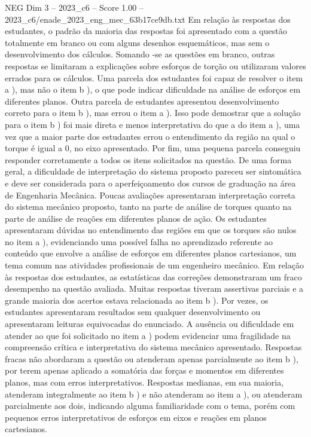 \begin{textsample}{NEG Dim 3 – 2023\_c6 – Score 1.00 – 2023\_c6/enade\_2023\_eng\_mec\_63b17ce9db.txt}
Em relação às respostas dos estudantes, o padrão da maioria das respostas foi apresentado com a questão totalmente em branco ou com alguns desenhos esquemáticos, mas sem o desenvolvimento dos cálculos.
Somando -se as questões em branco, outras respostas se limitaram a explicações sobre esforços de torção ou utilizaram valores errados para os cálculos.
Uma parcela dos estudantes foi capaz de resolver o item a ), mas não o item b ), o que pode indicar dificuldade na análise de esforços em diferentes planos.
Outra parcela de estudantes apresentou desenvolvimento correto para o item b ), mas errou o item a ).
Isso pode demostrar que a solução para o item b ) foi mais direta e menos interpretativa do que a do item a ), uma vez que a maior parte dos estudantes errou o entendimento da região na qual o torque é igual a 0, no eixo apresentado.
Por fim, uma pequena parcela conseguiu responder corretamente a todos os itens solicitados na questão.
De uma forma geral, a dificuldade de interpretação do sistema proposto pareceu ser sintomática e deve ser considerada para o aperfeiçoamento dos cursos de graduação na área de Engenharia Mecânica.
Poucas avaliações apresentaram interpretação correta do sistema mecânico proposto, tanto na parte de análise de torques quanto na parte de análise de reações em diferentes planos de ação.
Os estudantes apresentaram dúvidas no entendimento das regiões em que os torques são nulos no item a ), evidenciando uma possível falha no aprendizado referente ao conteúdo que envolve a análise de esforços em diferentes planos cartesianos, um tema comum nas atividades profissionais de um engenheiro mecânico.
Em relação às respostas dos estudantes, as estatísticas das correções demonstraram um fraco desempenho na questão avaliada.
Muitas respostas tiveram assertivas parciais e a grande maioria dos acertos estava relacionada ao item b ).
Por vezes, os estudantes apresentaram resultados sem qualquer desenvolvimento ou apresentaram leituras equivocadas do enunciado.
A ausência ou dificuldade em atender ao que foi solicitado no item a ) podem evidenciar uma fragilidade na compreensão crítica e interpretativa do sistema mecânico apresentado.
Respostas fracas não abordaram a questão ou atenderam apenas parcialmente ao item b ), por terem apenas aplicado a somatória das forças e momentos em diferentes planos, mas com erros interpretativos.
Respostas medianas, em sua maioria, atenderam integralmente ao item b ) e não atenderam ao item a ), ou atenderam parcialmente aos dois, indicando alguma familiaridade com o tema, porém com pequenos erros interpretativos de esforços em eixos e reações em planos cartesianos.

\end{textsample}
